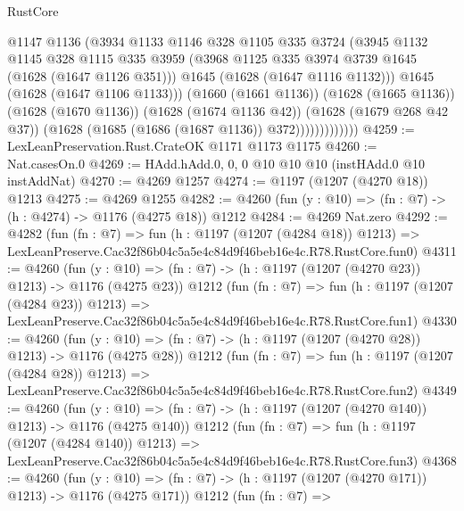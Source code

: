 \begin{lexlean}{RustCore}
\begin{coremodule}
                          @1147
                          @1136
                          (@3934
                            @1133
                            @1146
                            @328
                            @1105
                            @335
                            @3724
                            (@3945
                              @1132
                              @1145
                              @328
                              @1115
                              @335
                              @3959
                              (@3968 @1125 @335 @3974 @3739 @1645 (@1628 (@1647 @1126 @351)))
                              @1645
                              (@1628 (@1647 @1116 @1132)))
                            @1645
                            (@1628 (@1647 @1106 @1133)))
                          (@1660 (@1661 @1136))
                          (@1628 (@1665 @1136))
                          (@1628 (@1670 @1136))
                          (@1628 (@1674 @1136 @42))
                          (@1628 (@1679 @268 @42 @37))
                          (@1628 (@1685 (@1686 (@1687 @1136)) @372)))))))))))))
@4259 := LexLeanPreservation.Rust.CrateOK @1171 @1173 @1175
@4260 := Nat.casesOn.{0}
@4269 := HAdd.hAdd.{0, 0, 0} @10 @10 @10 (instHAdd.{0} @10 instAddNat)
@4270 := @4269 @1257
@4274 := @1197 (@1207 (@4270 @18)) @1213
@4275 := @4269 @1255
@4282 := @4260 (fun (y : @10) => (fn : @7) -> (h : @4274) -> @1176 (@4275 @18)) @1212
@4284 := @4269 Nat.zero
@4292 := @4282
    (fun (fn : @7) =>
    fun (h : @1197 (@1207 (@4284 @18)) @1213) =>
    LexLeanPreserve.Cac32f86b04c5a5e4c84d9f46beb16e4c.R78.RustCore.fun0)
@4311 := @4260
    (fun (y : @10) => (fn : @7) -> (h : @1197 (@1207 (@4270 @23)) @1213) -> @1176 (@4275 @23))
    @1212
    (fun (fn : @7) =>
    fun (h : @1197 (@1207 (@4284 @23)) @1213) =>
    LexLeanPreserve.Cac32f86b04c5a5e4c84d9f46beb16e4c.R78.RustCore.fun1)
@4330 := @4260
    (fun (y : @10) => (fn : @7) -> (h : @1197 (@1207 (@4270 @28)) @1213) -> @1176 (@4275 @28))
    @1212
    (fun (fn : @7) =>
    fun (h : @1197 (@1207 (@4284 @28)) @1213) =>
    LexLeanPreserve.Cac32f86b04c5a5e4c84d9f46beb16e4c.R78.RustCore.fun2)
@4349 := @4260
    (fun (y : @10) => (fn : @7) -> (h : @1197 (@1207 (@4270 @140)) @1213) -> @1176 (@4275 @140))
    @1212
    (fun (fn : @7) =>
    fun (h : @1197 (@1207 (@4284 @140)) @1213) =>
    LexLeanPreserve.Cac32f86b04c5a5e4c84d9f46beb16e4c.R78.RustCore.fun3)
@4368 := @4260
    (fun (y : @10) => (fn : @7) -> (h : @1197 (@1207 (@4270 @171)) @1213) -> @1176 (@4275 @171))
    @1212
    (fun (fn : @7) =>

\end{coremodule}
\end{lexlean}
